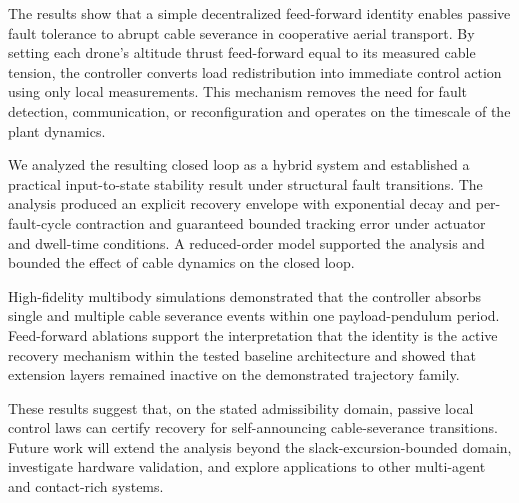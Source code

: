 
The results show that a simple decentralized feed-forward identity enables passive fault tolerance to abrupt cable severance in cooperative aerial transport. By setting each drone’s altitude thrust feed-forward equal to its measured cable tension, the controller converts load redistribution into immediate control action using only local measurements. This mechanism removes the need for fault detection, communication, or reconfiguration and operates on the timescale of the plant dynamics.

We analyzed the resulting closed loop as a hybrid system and established a practical input-to-state stability result under structural fault transitions. The analysis produced an explicit recovery envelope with exponential decay and per-fault-cycle contraction and guaranteed bounded tracking error under actuator and dwell-time conditions. A reduced-order model supported the analysis and bounded the effect of cable dynamics on the closed loop.

High-fidelity multibody simulations demonstrated that the controller absorbs single and multiple cable severance events within one payload-pendulum period. Feed-forward ablations support the interpretation that the identity is the active recovery mechanism within the tested baseline architecture and showed that extension layers remained inactive on the demonstrated trajectory family.

These results suggest that, on the stated admissibility domain, passive local control laws can certify recovery for self-announcing cable-severance transitions. Future work will extend the analysis beyond the slack-excursion-bounded domain, investigate hardware validation, and explore applications to other multi-agent and contact-rich systems.
